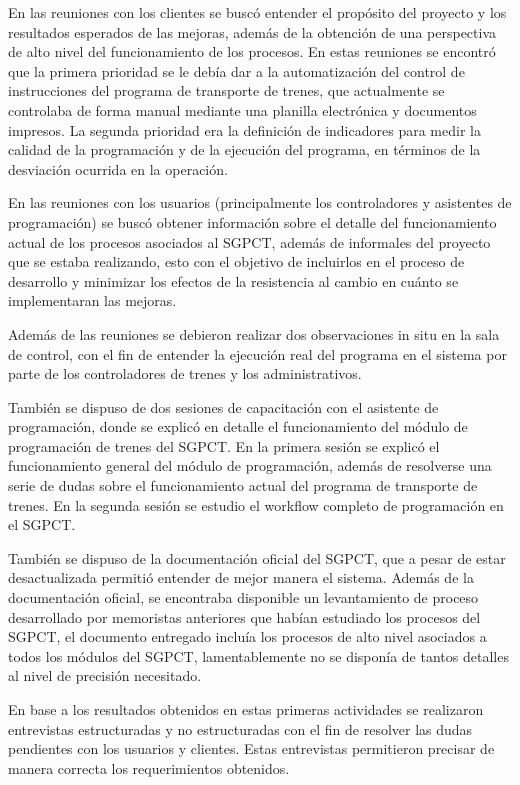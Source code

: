 \documentclass[oneside,12pt, letterpaper, titlepage]{book}
\begin{document}
En las reuniones con los clientes se buscó entender el propósito del proyecto y los resultados esperados de las mejoras, además de la obtención de una perspectiva de alto nivel del funcionamiento de los procesos. En estas reuniones se encontró que la primera prioridad se le debía dar a la automatización del control de instrucciones del programa de transporte de trenes, que actualmente se controlaba de forma manual mediante una planilla electrónica y documentos impresos. La segunda prioridad era la definición de indicadores para medir la calidad de la programación y de la ejecución del programa, en términos de la desviación ocurrida en la operación.

En las reuniones con los usuarios (principalmente los controladores y asistentes de programación) se buscó obtener información sobre el detalle del funcionamiento actual de los procesos asociados al SGPCT, además de informales del proyecto que se estaba realizando, esto con el objetivo de incluirlos en el proceso de desarrollo y minimizar los efectos de la resistencia al cambio en cuánto se implementaran las mejoras.

Además de las reuniones se debieron realizar dos observaciones in situ en la sala de control, con el fin de entender la ejecución real del programa en el sistema por parte de los controladores de trenes y los administrativos.

También se dispuso de dos sesiones de capacitación con el asistente de programación, donde se explicó en detalle el funcionamiento del módulo de programación de trenes del SGPCT. En la primera sesión se explicó el funcionamiento general del módulo de programación, además de resolverse una serie de dudas sobre el funcionamiento actual del programa de transporte de trenes. En la segunda sesión se estudio el workflow completo de programación en el SGPCT.

También se dispuso de la documentación oficial del SGPCT, que a pesar de estar desactualizada permitió entender de mejor manera el sistema. Además de la documentación oficial, se encontraba disponible un levantamiento de proceso desarrollado por memoristas anteriores que habían estudiado los procesos del SGPCT, el documento entregado incluía los procesos de alto nivel asociados a todos los módulos del SGPCT, lamentablemente no se disponía de tantos detalles al nivel de precisión necesitado.

En base a los resultados obtenidos en estas primeras actividades se realizaron entrevistas estructuradas y no estructuradas con el fin de resolver las dudas pendientes con los usuarios y clientes. Estas entrevistas permitieron precisar de manera correcta los requerimientos obtenidos.
\end{document}
